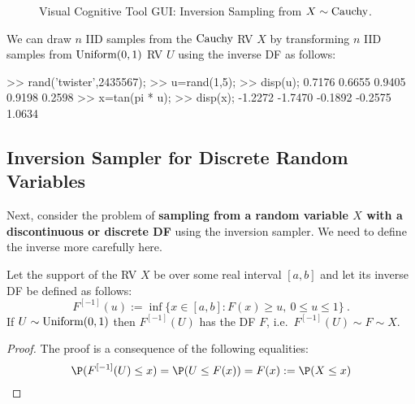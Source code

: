 \begin{figure}[htpb]
\caption{Visual Cognitive Tool GUI: Inversion Sampling from $X \sim \mbox{{\rm Cauchy}}$.\label{F:guiInversionSamplerCauchy}}
\centering   {}
\end{figure}

\begin{simulation}[$\cauchy$]\label{SIM:StdCauchy}
We can draw $n$ IID samples from the $\cauchy$ RV $X$ by transforming $n$ IID samples from $\mbox{{\rm Uniform}}(0,1)$ RV $U$ using the inverse DF as follows:
\begin{VrbM}
>> rand('twister',2435567);        %
>> u=rand(1,5);			%
>> disp(u);			%
    0.7176    0.6655    0.9405    0.9198    0.2598
>> x=tan(pi * u);     %
>> disp(x);  %
   -1.2272   -1.7470   -0.1892   -0.2575    1.0634
\end{VrbM}
\end{simulation}


\subsection{Inversion Sampler for Discrete Random Variables}\label{S:InvSDiscrete}
Next, consider the problem of {\bf sampling from a random variable $X$ with a discontinuous or discrete DF} using the inversion sampler.  We need to define the inverse more carefully here.
\begin{prop}
Let the support of the RV $X$ be over some real interval $[a,b]$ and let its inverse DF be defined as follows:
\[
F^{[-1]}(u) := \inf\{ x \in [a,b]: F(x) \geq u, \ 0 \leq u \leq 1 \} \ .
\]
If $U \sim \mbox{{\rm Uniform}}(0,1)$ then $F^{[-1]}(U)$ has the DF $F$, i.e.~$F^{[-1]}(U) \sim F \sim X$.
\end{prop}
\begin{proof}
The proof is a consequence of the following equalities:
\[
\P(F^{[-1]}(U) \leq x) = \P(U \leq F(x)) = F(x) := \P(X \leq x)
\]
\end{proof}


